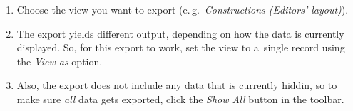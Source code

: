 \documentclass[12pt,a4paper]{scrartcl}
\begin{document}
\begin{enumerate}
  \item
    Choose the view you want to export
    (e.\,g.\ \emph{Constructions (Editors' layout)}).\\[1ex]{}

  \item
    The export yields different output, depending on how the data is currently
    displayed.
    So, for this export to work, set the view to a~single record using the
    \emph{View as} option.\\[1ex]{}

    \newpage
  \item
    Also, the export does not include any data that is currently hiddin, so to
    make sure \emph{all} data gets exported, click the \emph{Show All} button in
    the toolbar.\\[1ex]{}



\end{enumerate}
\end{document}

